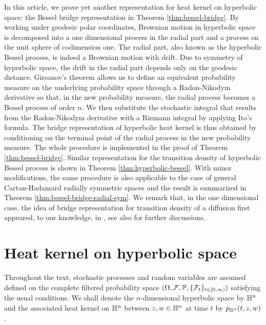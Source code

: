 \documentclass[12pt, reqno]{amsart}
\numberwithin{equation}{section}
\begin{document}
In this article, we prove yet another representation for heat kernel on hyperbolic space: the Bessel bridge representation in Theorem \ref{thm:bessel-bridge}. By working under geodesic polar coordinates, Brownian motion in hyperbolic space is decomposed into a one dimensional process in the radial part and a process on the unit sphere of codimension one. The radial part, also known as the hyperbolic Bessel process, is indeed a Brownian motion with drift. Due to symmetry of hyperbolic space, the drift in the radial part depends only on the geodesic distance. Girsanov's theorem allows us to define an equivalent probability measure on the underlying probability space through a Radon-Nikodym derivative so that, in the new probability measure, the radial process becomes a Bessel process of order $n$. We then substitute the stochastic integral that results from the Radon-Nikodym derivative with a Riemann integral by applying Ito's formula. The bridge representation of hyperbolic heat kernel is thus obtained by conditioning on the terminal point of the radial process in the new probability measure. The whole procedure is implemented in the proof of Theorem \ref{thm:bessel-bridge}. Similar representation for the transition density of hyperbolic Bessel process is shown in Theorem \ref{thm:hyperbolic-bessel}. With minor modifications, the same procedure is also applicable to the case of general Cartan-Hadamard radially symmetric spaces and the result is summarized in Theorem \ref{thm:bessel-bridge-radial-sym}. We remark that, in the one dimensional case, the idea of bridge representation for transition density of a diffusion first appeared, to our knowledge, in \cite{rogers}, see also \cite{w-gatheral} for further discussions. 

%
%

\section{Heat kernel on hyperbolic space}
Throughout the text, stochastic processes and random variables are assumed defined on the complete filtered probability space $(\Omega,\mathcal{F}, \mathbb{P}, \{\mathcal{F}_t\}_{t\in[0,\infty)})$ satisfying the usual conditions. We shall denote the $n$-dimensional hyperbolic space by $\mathbb{H}^n$ and the associated heat kernel on $\mathbb{H}^n$ between $z, w \in \mathbb{H}^n$ at time $t$ by $p_{\mathbb{H}^n}(t,z,w)$. 
\end{document}
